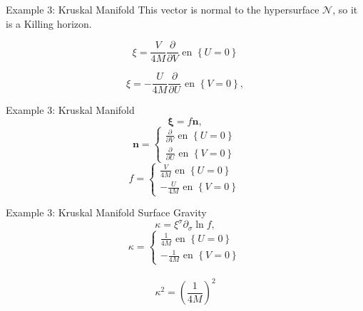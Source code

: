 \documentclass{beamer}
\begin{document}
        \begin{frame}{Example 3: Kruskal Manifold}
        	This vector is normal to the hypersurface $\mathcal{N}$, so it is
a Killing horizon. 
			\pause
            
            \begin{equation*}
            \xi=\frac{V}{4M}\frac{\partial}{\partial V}\mbox{ en }\left\{ U=0\right\} 
            \end{equation*}
            
            \begin{equation*}
            \xi=-\frac{U}{4M}\frac{\partial}{\partial U}\mbox{ en }\left\{ V=0\right\} ,
            \end{equation*}
        \end{frame}
        
        \begin{frame}{Example 3: Kruskal Manifold}
        	\begin{equation*}
            \mathbf{\xi}=f\mathbf{n},
            \end{equation*}
			\pause
            \begin{equation*}
            \mathbf{n}=\left\{ \begin{array}{c}
            \frac{\partial}{\partial V}\mbox{ en }\left\{ U=0\right\} \\
            \frac{\partial}{\partial U}\mbox{ en }\left\{ V=0\right\} 
            \end{array}\right.
            \end{equation*}
            \pause
            \begin{equation*}
            f=\left\{ \begin{array}{c}
            \frac{V}{4M}\mbox{ en }\left\{ U=0\right\} \\
            -\frac{U}{4M}\mbox{ en }\left\{ V=0\right\} 
            \end{array}\right.
            \end{equation*}
        \end{frame}
  
  		\begin{frame}{Example 3: Kruskal Manifold}
        	Surface Gravity\\
            \begin{equation*}
            \kappa=\xi^{\sigma}\partial_{\sigma}\ln f,
            \end{equation*}
            \pause 
            \begin{equation*}
            \kappa=\left\{ \begin{array}{c}
            \frac{1}{4M}\mbox{ en }\left\{ U=0\right\} \\
            -\frac{1}{4M}\mbox{ en }\left\{ V=0\right\} 
            \end{array}\right.
            \end{equation*}\\
            \pause
            $$\kappa^{2}=\left(\frac{1}{4M}\right)^{2}$$
  		\end{frame}
        
\end{document}
